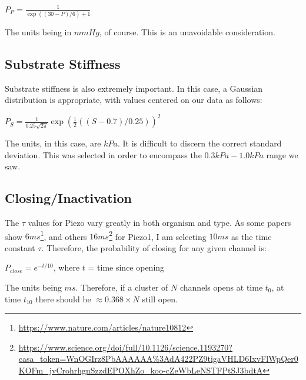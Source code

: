 \documentclass[12pt]{amsart}
\begin{document}
\bigskip
\begin{center}

    $P_P = \frac{1}{\exp((30 - P)/6) + 1}$
    
\end{center}

\bigskip

The units being in $mmHg$, of course. This is an unavoidable consideration. 

\subsection{Substrate Stiffness} Substrate stiffness is also extremely important. In this case, a Gaussian distribution is appropriate, with values centered on our data as follows: 

\bigskip

\begin{center}

    $P_S = \frac{1}{0.25\sqrt{2 \pi}}\exp(\frac{1}{2}((S - 0.7)/0.25))^2$
    
\end{center}

\bigskip

The units, in this case, are $kPa$. It is difficult to discern the correct standard deviation. This was selected in order to encompass the $0.3kPa-1.0kPa$ range we saw. 

\subsection{Closing/Inactivation} The $\tau$ values for Piezo vary greatly in both organism and type. As some papers show $6ms$\footnote{\url{https://www.nature.com/articles/nature10812}}, and others $16ms$\footnote{\url{https://www.science.org/doi/full/10.1126/science.1193270?casa_token=WnOGIrz8PbAAAAAA\%3AdA422PZ9tigaVHLD6IxvFlWpQer0KOFm_jvCrohrhgnSzzdEPOXhZo_koo-cZeWbLeNSTFPtSJ3bdtA}} for Piezo1, I am selecting $10ms$ as the time constant $\tau$. Therefore, the probability of closing for any given channel is: 

\bigskip

\begin{center}

$P_{close} = e^{-t/10}$, where $t$ = time since opening

\end{center}

\bigskip

The units being $ms$. Therefore, if a cluster of $N$ channels opens at time $t_0$, at time $t_{10}$ there should be $\approx 0.368 \times N$ still open.  
\end{document}
